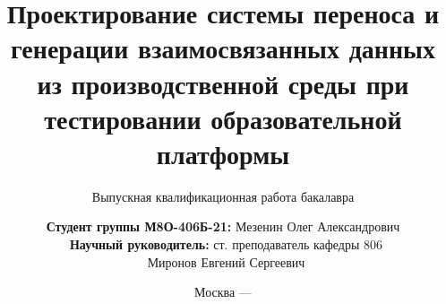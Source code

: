 \title{Проектирование системы переноса и генерации взаимосвязанных данных из производственной среды при тестировании образовательной платформы}

\subtitle{Выпускная квалификационная работа бакалавра}


\author[Мезенин Олег Александрович]
{
	\textbf{Студент группы М8О-406Б-21:} Мезенин Олег Александрович\\
	\ \textbf{Научный руководитель:} ст. преподаватель кафедры 806\\\ Миронов Евгений Сергеевич
}


\date{Москва --- \the\year}

